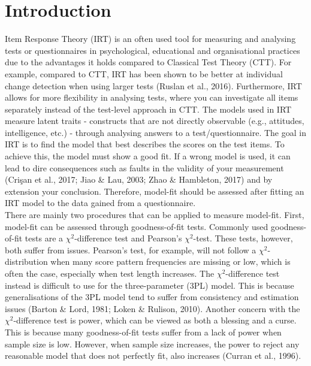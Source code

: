 \documentclass[Royal,sageapa,times,doublespace]{sagej}
\begin{document}
\section{Introduction}
Item Response Theory (IRT) is an often used tool for measuring and analysing tests or questionnaires in psychological, educational and organisational practices due to the advantages it holds compared to Classical Test Theory (CTT). For example, compared to CTT, IRT has been shown to be better at individual change detection when using larger tests (Ruslan et al., 2016). Furthermore, IRT allows for more flexibility in analysing tests, where you can investigate all items separately instead of the test-level approach in CTT. The models used in IRT measure latent traits - constructs that are not directly observable (e.g., attitudes, intelligence, etc.) - through analysing answers to a test/questionnaire. The goal in IRT is to find the model that best describes the scores on the test items. To achieve this, the model must show a good fit. If a wrong model is used, it can lead to dire consequences such as faults in the validity of your measurement (Cri\c{s}an et al., 2017; Jiao \& Lau, 2003; Zhao \& Hambleton, 2017) and by extension your conclusion. Therefore, model-fit should be assessed after fitting an IRT model to the data gained from a questionnaire. \\
\indent There are mainly two procedures that can be applied to measure model-fit. First, model-fit can be assessed through goodness-of-fit tests. Commonly used goodness-of-fit tests are a $\chi^2$-difference test and Pearson's $\chi^2$-test. These tests, however, both suffer from issues. Pearson's test, for example, will not follow a $\chi^2$-distribution when many score pattern frequencies are missing or low, which is often the case, especially when test length increases. The $\chi^2$-difference test instead is difficult to use for the three-parameter (3PL) model. This is because generalisations of the 3PL model tend to suffer from consistency and estimation issues (Barton \& Lord, 1981; Loken \& Rulison, 2010). Another concern with the $\chi^2$-difference test is power, which can be viewed as both a blessing and a curse. This is because many goodness-of-fit tests suffer from a lack of power when sample size is low. However, when sample size increases, the power to reject any reasonable model that does not perfectly fit, also increases (Curran et al., 1996). \\
\end{document}
